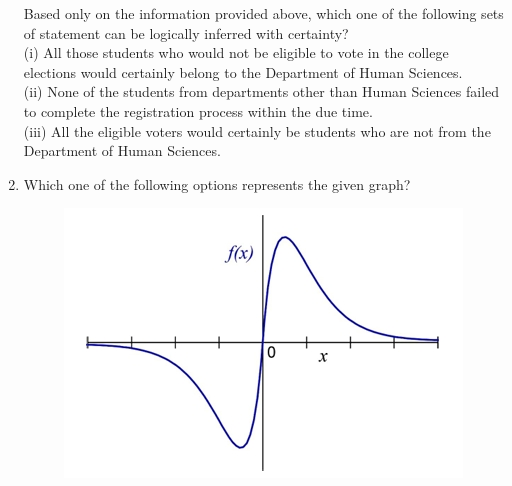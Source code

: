 \documentclass[journal,12pt,onecolumn]{IEEEtran}
\theoremstyle{remark}
\begin{document}
\begin{enumerate}
Based only on the information provided above, which one of the following sets of statement can be logically inferred with certainty? \\
(i) All those students who would not be eligible to vote in the college elections would certainly belong to the Department of Human Sciences. \\
(ii) None of the students from departments other than Human Sciences failed to complete the registration process within the due time. \\
(iii) All the eligible voters would certainly be students who are not from the Department of Human Sciences. \\

\begin{enumerate}
\end{enumerate}
\hfill{}

\newpage

\item Which one of the following options represents the given graph? \\[0.5em]
\begin{figure}[h]
    \centering
    \includegraphics[width=0.5\columnwidth]{figs/img 2.jpeg}
    \caption{}
    \label{fig:placeholder}
\end{figure}



\end{enumerate}
\end{document}

